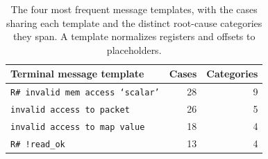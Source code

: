 \begin{table}[t]
  \centering
  \caption{The four most frequent message templates, with the cases sharing each template and the distinct root-cause categories they span. A template normalizes registers and offsets to placeholders.}
  \label{tab:fanout}
  \small
  \begin{tabular}{@{}l r r@{}}
    \toprule
    Terminal message template & Cases & Categories \\
    \midrule
    \texttt{R\# invalid mem access `scalar'}   & 28 & 9 \\
    \texttt{invalid access to packet}          & 26 & 5 \\
    \texttt{invalid access to map value}       & 18 & 4 \\
    \texttt{R\# !read\_ok}                     & 13 & 4 \\
    \bottomrule
  \end{tabular}
\end{table}